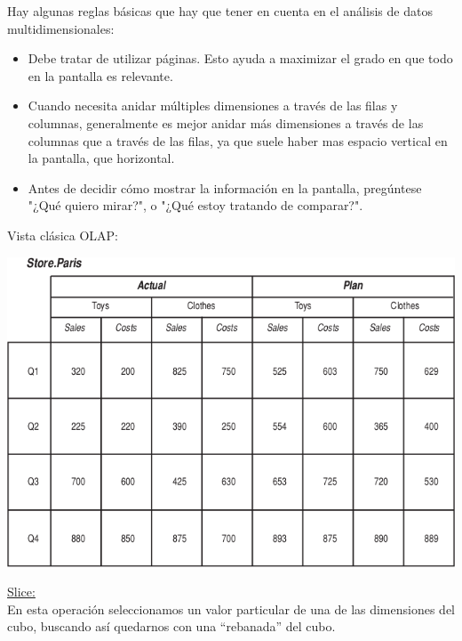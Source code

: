 \documentclass{fancyslides}
\begin{document}
\begin{frame}
\misc
{
Hay algunas reglas básicas que hay que tener en cuenta en el análisis de datos multidimensionales:
\begin{itemize}
  \item Debe tratar de utilizar páginas. Esto ayuda a maximizar el grado en que todo en la pantalla es relevante.
  \item Cuando necesita anidar múltiples dimensiones a través de las filas y columnas, generalmente es mejor anidar más dimensiones a través de las columnas que a través de las filas, ya que suele haber mas espacio vertical en la pantalla, que horizontal.
  \item Antes de decidir cómo mostrar la información en la pantalla, pregúntese "¿Qué quiero mirar?", o "¿Qué estoy tratando de comparar?".
\end{itemize}
}
\end{frame}

\begin{frame}
\misc
{ Vista clásica OLAP:
\begin{center}
\includegraphics[scale=0.4]{cube_10}
\end{center}
}
\end{frame}


\begin{frame}
\end{frame}


\begin{frame}
\misc
{
  \underline{Slice:}\\
En esta operación seleccionamos un valor particular de una de las dimensiones del cubo, buscando así quedarnos con una “rebanada” del cubo.
}
\end{frame}
\end{document}
